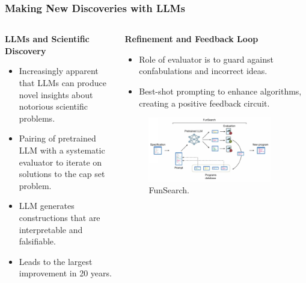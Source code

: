 \documentclass{beamer}
\begin{document}
\begin{frame}
    \frametitle{Making New Discoveries with LLMs}
    \begin{columns}[T]
        \begin{column}{.48\textwidth}
            \textbf{LLMs and Scientific Discovery}
            \begin{itemize}
                \item Increasingly apparent that LLMs can produce novel insights about notorious scientific problems.
                \item Pairing of pretrained LLM with a systematic evaluator to iterate on solutions to the cap set problem.
                \item LLM generates constructions that are interpretable and falsifiable.
                \item Leads to the largest improvement in 20 years. 
            \end{itemize}
        \end{column}
        \hfill
        \begin{column}{.48\textwidth}
            \textbf{Refinement and Feedback Loop}
            \begin{itemize}
                \item Role of evaluator is to guard against confabulations and incorrect ideas.
                \item Best-shot prompting to enhance algorithms, creating a positive feedback circuit.
            \end{itemize}
            \begin{figure}
                \centering
                \includegraphics[width=0.9\textwidth]{FunSearch.png}
                \caption{FunSearch.}
            \end{figure}
        \end{column}
    \end{columns}
\end{frame}
    
\end{document}
